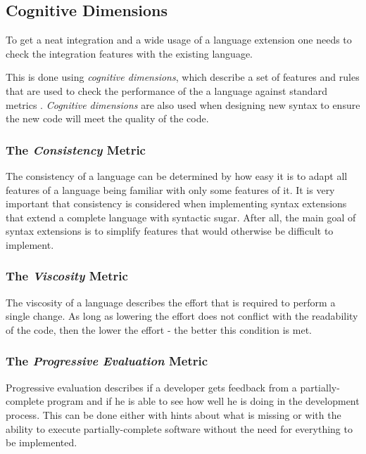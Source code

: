 \documentclass{report}
\begin{document}
\subsection{Cognitive Dimensions}
\label{backgroundCognitiveDimensions}

To get a neat integration and a wide usage of a language extension one needs to check the integration features with the existing language.

This is done using \emph{cognitive dimensions}, which describe a set of features and rules that are used to check the performance of the a language against standard metrics \cite{Green-Cognitive-1996}. \emph{Cognitive dimensions} are also used when designing new syntax to ensure the new code will meet the quality of the code.

\subsubsection*{The \emph{Consistency} Metric}

The consistency of a language can be determined by how easy it is to adapt all features of a language being familiar with only some features of it. It is very important that consistency is considered when implementing syntax extensions that extend a complete language with syntactic sugar. After all, the main goal of syntax extensions is to simplify features that would otherwise be difficult to implement.


\subsubsection*{The \emph{Viscosity} Metric}

The viscosity of a language describes the effort that is required to perform a single change. As long as lowering the effort does not conflict with the readability of the code, then the lower the effort - the better this condition is met.


\subsubsection*{The \emph{Progressive Evaluation} Metric}

Progressive evaluation describes if a developer gets feedback from a partially-complete program and if he is able to see how well he is doing in the development process. This can be done either with hints about what is missing or with the ability to execute partially-complete software without the need for everything to be implemented.
\end{document}
